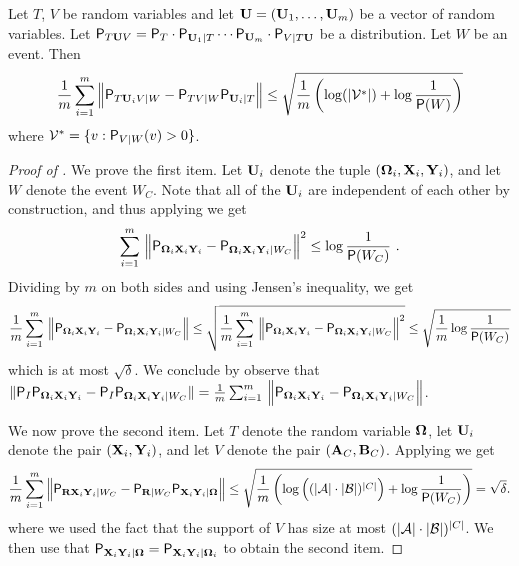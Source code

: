 \begin{corollary}
\label{cor:hol}
Let $T$, $V$ be random variables and let $\bU = (\bU_1,\ldots,\bU_m)$ be a vector of random variables. Let $\P_{T\bU V} = \P_T \cdot \P_{\bU_1 | T} \cdots \P_{\bU_m} \cdot \P_{V|T \bU}$ be a distribution. Let $W$ be an event. Then
\[
	\frac{1}{m} \sum_{i=1}^m \Big \| \P_{T \bU_i V|W} - \P_{TV|W} \P_{\bU_i | T} \Big \| \leq \sqrt{ \frac{1}{m} \left ( \log(|\mathcal{V}^*|) + \log \frac{1}{\P(W)}  \right)}
\]
where $\mathcal{V}^* = \{ v : \P_{V|W}(v) > 0 \}$. 
\end{corollary}
\begin{proof}[Proof of ]

We prove the first item. Let $\bU_i$ denote the tuple $(\bOmega_i,\bX_i,\bY_i)$, and let $W$ denote the event $W_C$. Note that all of the $\bU_i$ are independent of each other by construction, and thus applying  we get
\[
\sum_{i=1}^m \, \Big \| \P_{\bOmega_i \bX_i \bY_i} - \P_{\bOmega_i \bX_i \bY_i | W_C} \Big \|^2 \leq \log \frac{1}{\P(W_C)}~.
\]
Dividing by $m$ on both sides and using Jensen's inequality, we get
\[
\frac{1}{m} \sum_{i=1}^m \, \Big \| \P_{\bOmega_i \bX_i \bY_i} - \P_{\bOmega_i \bX_i \bY_i | W_C} \Big \| \leq \sqrt{ \frac{1}{m} \sum_{i=1}^m \, \Big \| \P_{\bOmega_i \bX_i \bY_i} - \P_{\bOmega_i \bX_i \bY_i | W_C} \Big \|^2} \leq \sqrt{ \frac{1}{m} \log \frac{1}{\P(W_C)}}
\]
which is at most $\sqrt{\delta}$. We conclude by observe that $\| \P_I \P_{\bOmega_i \bX_i \bY_i} - \P_I \P_{\bOmega_i \bX_i \bY_i | W_C} \| = \frac{1}{m} \sum_{i=1}^m \, \Big \| \P_{\bOmega_i \bX_i \bY_i} - \P_{\bOmega_i \bX_i \bY_i | W_C} \Big \|$.

We now prove the second item. Let $T$ denote the random variable $\bOmega$, let $\bU_i$ denote the pair $(\bX_i,\bY_i)$, and let $V$ denote the pair $(\bA_C,\bB_C)$. Applying  we get
\begin{equation}
\label{eq:classical-skew-1}
	\frac{1}{m} \sum_{i=1}^m \Big \| \P_{\bR \bX_i \bY_i|W_C} - \P_{\bR|W_C} \P_{\bX_i \bY_i | \bOmega} \Big \| \leq \sqrt{ \frac{1}{m} \left ( \log \Big ( (|\A| \cdot |\B|)^{|C|} \Big) + \log \frac{1}{\P(W_C)}  \right)} = \sqrt{\delta}.
\end{equation}
where we used the fact that the support of $V$ has size at most $(|\A| \cdot |\B|)^{|C|}$. We then use that $\P_{\bX_i \bY_i | \bOmega} = \P_{\bX_i \bY_i | \bOmega_i}$ to obtain the second item.


\end{proof}

